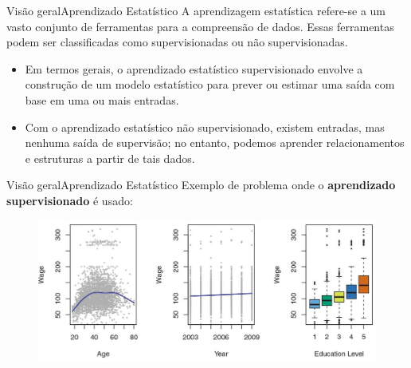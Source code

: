 \documentclass[t]{beamer}
\begin{document}

\begin{ftst}{Visão geral}{{Aprendizado Estatístico}}
\justifying
A aprendizagem estatística refere-se a um vasto conjunto de ferramentas para a compreensão de dados.
\vone
Essas ferramentas podem ser classificadas como supervisionadas ou não supervisionadas. 
\vone
\begin{itemize}
    \item Em termos gerais, o aprendizado estatístico supervisionado envolve a construção de um modelo estatístico para prever ou estimar uma saída com base em uma ou mais entradas. 
    \item Com o aprendizado estatístico não supervisionado, existem entradas, mas nenhuma saída de supervisão; no entanto, podemos aprender relacionamentos e estruturas a partir de tais dados.
\end{itemize}
\end{ftst}


\begin{ftst}{Visão geral}{{Aprendizado Estatístico}}
\justifying
Exemplo de problema onde o \textbf{aprendizado supervisionado} é usado:
\vone

\begin{figure}
    \centering
    \includegraphics[scale=0.9]{Figuras/slide03_02.jpg}
\end{figure}
\end{ftst}

\end{document}
